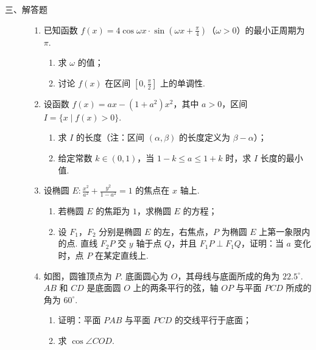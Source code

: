 \begin{description}

    \item[三、解答题]

    \begin{enumerate}[leftmargin=5pt]

      \addtocounter{enumi}{+15}

        \item 已知函数 \(f(x) = 4\cos \omega x \cdot \sin \left( \omega x + \frac{\pi}{4} \right)\)（\(\omega > 0\)）的最小正周期为 \( \pi \).
\begin{enumerate}
\item 求 \( \omega \) 的值；
\item 讨论 \(f(x)\) 在区间 \(\left[0, \frac{\pi}{2}\right]\) 上的单调性.
\end{enumerate}

        \item 设函数 \( f(x) = ax - (1 + a^2)x^2 \)，其中 \(a > 0\)，区间 \( I = \{x \mid f(x) > 0\} \).
\begin{enumerate}
\item 求 \(I\) 的长度（注：区间 \((\alpha, \beta)\) 的长度定义为 \(\beta - \alpha\)）；
\item 给定常数 \(k \in (0,1)\)，当 \(1 - k \leqslant a \leqslant 1 + k\) 时，求 \(I\) 长度的最小值.
\end{enumerate}

        \item 设椭圆 \(E: \frac{x^2}{a^2} + \frac{y^2}{1-a^2} = 1\) 的焦点在 \(x\) 轴上.
\begin{enumerate}
\item 若椭圆 \(E\) 的焦距为 \(1\)，求椭圆 \(E\) 的方程；
\item 设 \(F_{1}\)，\(F_{2}\) 分别是椭圆 \(E\) 的左，右焦点，\(P\) 为椭圆 \(E\) 上第一象限内的点. 直线 \(F_{2}P\) 交 \(y\) 轴于点 \(Q\)，并且 \(F_{1}P \perp F_{1}Q\)，证明：当 \(a\) 变化时，点 \(P\) 在某定直线上.
\end{enumerate}

        \item 如图，圆锥顶点为 \(P\). 底面圆心为 \(O\)，其母线与底面所成的角为 \(22.5^{\circ}\). \(AB\) 和 \(CD\) 是底面圆 \(O\) 上的两条平行的弦，轴 \(OP\) 与平面 \(PCD\) 所成的角为 \(60^{\circ}\).

\begin{enumerate}
\item 证明：平面 \(PAB\) 与平面 \(PCD\) 的交线平行于底面；
\item 求 \( \cos\angle COD \).
\end{enumerate}


\end{enumerate}
\end{description}
